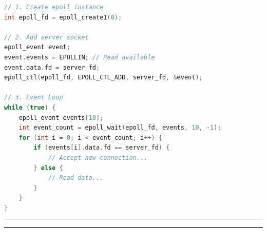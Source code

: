 \begin{lstlisting}[language={C++}]
// 1. Create epoll instance
int epoll_fd = epoll_create1(0);

// 2. Add server socket
epoll_event event;
event.events = EPOLLIN; // Read available
event.data.fd = server_fd;
epoll_ctl(epoll_fd, EPOLL_CTL_ADD, server_fd, &event);

// 3. Event Loop
while (true) {
    epoll_event events[10];
    int event_count = epoll_wait(epoll_fd, events, 10, -1);
    for (int i = 0; i < event_count; i++) {
        if (events[i].data.fd == server_fd) {
            // Accept new connection...
        } else {
            // Read data...
        }
    }
}
\end{lstlisting}

\begin{center}\rule{0.5\linewidth}{0.5pt}\end{center}

\begin{center}\rule{0.5\linewidth}{0.5pt}\end{center}
